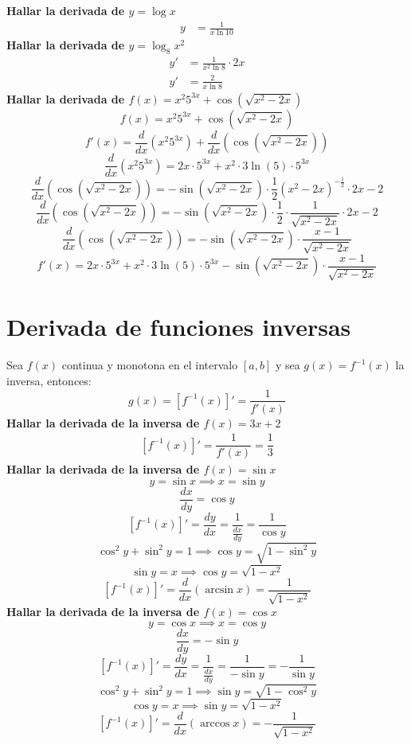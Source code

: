 \documentclass[12pt,a4paper,fleqn]{article}
\begin{document}
\textbf{Hallar la derivada de $y=\log x$}
\begin{align*}
	y & =\frac{1}{x\ln 10}
\end{align*}
\textbf{Hallar la derivada de $y=\log_8 x^2$}
\begin{align*}
	y' & =\frac{1}{x^2 \ln 8}\cdot 2x \\
	y' & =\frac{2}{x \ln 8}
\end{align*}
\noindent\textbf{Hallar la derivada de \( f(x) = x^2 5^{3x} + \cos (\sqrt{x^2 - 2x}) \)}
\[
	f(x) = x^2 5^{3x} + \cos (\sqrt{x^2 - 2x})
\]
\[
	f'(x) = \frac{d}{dx} (x^2 5^{3x}) + \frac{d}{dx} (\cos (\sqrt{x^2 - 2x}))
\]
\[
	\frac{d}{dx} (x^2 5^{3x}) = 2x \cdot 5^{3x} + x^2 \cdot 3 \ln(5) \cdot 5^{3x}
\]
\[
	\frac{d}{dx} (\cos (\sqrt{x^2 - 2x})) = -\sin (\sqrt{x^2 - 2x}) \cdot \frac{1}{2}(x^2-2x)^{-\frac{1}{2}}\cdot 2x -2
\]
\[
	\frac{d}{dx} (\cos (\sqrt{x^2 - 2x})) = -\sin (\sqrt{x^2 - 2x}) \cdot \frac{1}{2} \cdot \frac{1}{\sqrt{x^2-2x}}\cdot 2x -2
\]
\[
	\frac{d}{dx} (\cos (\sqrt{x^2 - 2x})) = -\sin (\sqrt{x^2 - 2x}) \cdot \frac{x - 1}{\sqrt{x^2 - 2x}}
\]
\[
	f'(x) = 2x \cdot 5^{3x} + x^2 \cdot 3 \ln(5) \cdot 5^{3x} - \sin (\sqrt{x^2 - 2x}) \cdot \frac{x - 1}{\sqrt{x^2 - 2x}}
\]

\section{Derivada de funciones inversas}
Sea $f(x)$ continua y monotona en el intervalo $[a, b]$ y sea $g(x)=f^{-1}(x)$ la inversa, entonces:
\[
	\boxed{g(x)=\left[f^{-1}(x)\right]'=\dfrac{1}{f'(x)}}
\]
\textbf{Hallar la derivada de la inversa de $f(x)=3x+2$}
\begin{align*}
	\left[f^{-1}(x)\right]'=\dfrac{1}{f'(x)}=\dfrac{1}{3}
\end{align*}
\noindent\textbf{Hallar la derivada de la inversa de \( f(x) = \sin x \)}
\[
	y = \sin x \implies x = \sin y
\]
\[
	\frac{dx}{dy} = \cos y
\]
\[
	\left[f^{-1}(x)\right]' = \frac{dy}{dx} = \frac{1}{\frac{dx}{dy}} = \frac{1}{\cos y}
\]
\[
	\cos^2 y + \sin^2 y = 1 \implies \cos y = \sqrt{1 - \sin^2 y}
\]
\[
	\sin y = x \implies \cos y = \sqrt{1 - x^2}
\]
\[
	\left[f^{-1}(x)\right]'=\frac{d}{dx} (\arcsin x) = \frac{1}{\sqrt{1 - x^2}}
\]
\noindent\textbf{Hallar la derivada de la inversa de \( f(x) = \cos x \)}
\[
	y = \cos x \implies x = \cos y
\]
\[
	\frac{dx}{dy} = -\sin y
\]
\[
	\left[f^{-1}(x)\right]' = \frac{dy}{dx} = \frac{1}{\frac{dx}{dy}} = \frac{1}{-\sin y} = -\frac{1}{\sin y}
\]
\[
	\cos^2 y + \sin^2 y = 1 \implies \sin y = \sqrt{1 - \cos^2 y}
\]
\[
	\cos y = x \implies \sin y = \sqrt{1 - x^2}
\]
\[
	\left[f^{-1}(x)\right]'=\frac{d}{dx} (\arccos x) = -\frac{1}{\sqrt{1 - x^2}}
\]
\end{document}
